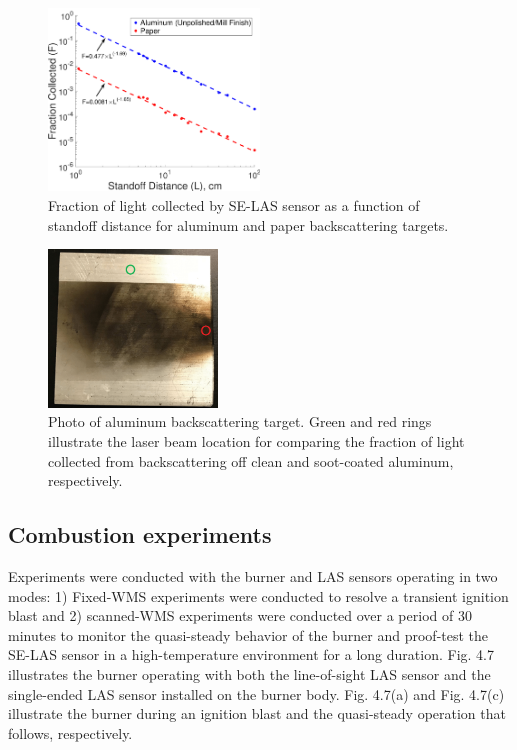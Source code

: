  \begin{figure}[h]
    \centering
        \includegraphics[width=0.5\textwidth]{fig/ch4_fig11_v2.png}
        \caption{Fraction of light collected by SE-LAS sensor as a function of standoff distance for aluminum and paper backscattering targets.}
    \label{fig:ch4_5}
\end{figure}

 \begin{figure}[h]
    \centering
        \includegraphics[width=0.4\textwidth]{fig/ch4_fig12.png}
        \caption{Photo of aluminum backscattering target. Green and red rings illustrate the laser beam location for comparing the fraction of light collected from backscattering off clean and soot-coated aluminum, respectively.}
    \label{fig:ch4_6}
\end{figure}


\subsection{Combustion experiments}
Experiments were conducted with the burner and LAS sensors operating in two modes: 1) Fixed-WMS experiments were conducted to resolve a transient ignition blast and 2) scanned-WMS experiments were conducted over a period of 30 minutes to monitor the quasi-steady behavior of the burner and proof-test the SE-LAS sensor in a high-temperature environment for a long duration. Fig. 4.7 illustrates the burner operating with both the line-of-sight LAS sensor and the single-ended LAS sensor installed on the burner body. Fig. 4.7(a) and Fig. 4.7(c) illustrate the burner during an ignition blast and the quasi-steady operation that follows, respectively.

